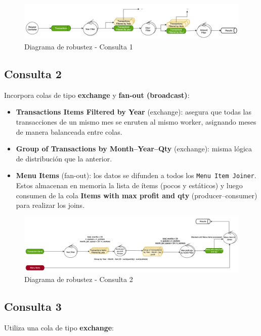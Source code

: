 \documentclass[titlepage,a4paper]{article}
\begin{document}
\begin{figure}[H]
    \centering
    \includegraphics[width=1.0\textwidth]{consulta1.png}
    \caption{Diagrama de robustez - Consulta 1}
\end{figure}


\subsection*{Consulta 2}
Incorpora colas de tipo \textbf{exchange} y \textbf{fan-out (broadcast)}:

\begin{itemize}
    \item \textbf{Transactions Items Filtered by Year} (exchange): asegura que todas las transacciones de un mismo mes se enruten al mismo worker, asignando meses de manera balanceada entre colas.
    \item \textbf{Group of Transactions by Month--Year--Qty} (exchange): misma lógica de distribución que la anterior.
    \item \textbf{Menu Items} (fan-out): los datos se difunden a todos los \texttt{Menu Item Joiner}. Estos almacenan en memoria la lista de ítems (pocos y estáticos) y luego consumen de la cola \textbf{Items with max profit and qty} (producer--consumer) para realizar los joins.
\end{itemize}

\begin{figure}[H]
    \centering
    \includegraphics[width=1.0\textwidth]{consulta2.png}
    \caption{Diagrama de robustez - Consulta 2}
\end{figure}

\subsection*{Consulta 3}
Utiliza una cola de tipo \textbf{exchange}:
\end{document}
